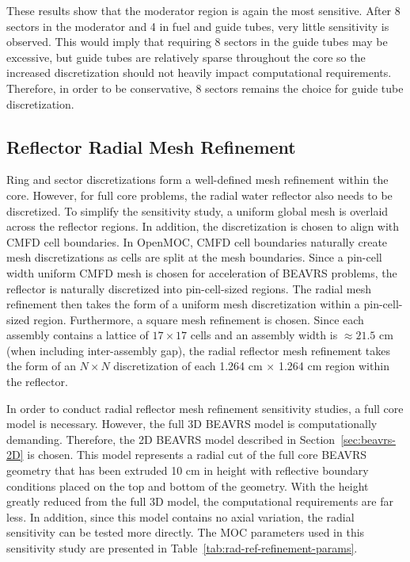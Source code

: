 These results show that the moderator region is again the most sensitive. After 8 sectors in the moderator and 4 in fuel and guide tubes, very little sensitivity is observed. This would imply that requiring 8 sectors in the guide tubes may be excessive, but guide tubes are relatively sparse throughout the core so the increased discretization should not heavily impact computational requirements. Therefore, in order to be conservative, 8 sectors remains the choice for guide tube discretization.

\subsection{Reflector Radial Mesh Refinement}

Ring and sector discretizations form a well-defined mesh refinement within the core. However, for full core problems, the radial water reflector also needs to be discretized. To simplify the sensitivity study, a uniform global mesh is overlaid across the reflector regions. In addition, the discretization is chosen to align with \ac{CMFD} cell boundaries. In OpenMOC, \ac{CMFD} cell boundaries naturally create mesh discretizations as cells are split at the mesh boundaries. Since a pin-cell width uniform \ac{CMFD} mesh is chosen for acceleration of BEAVRS problems, the reflector is naturally discretized into pin-cell-sized regions. The radial mesh refinement then takes the form of a uniform mesh discretization within a pin-cell-sized region. Furthermore, a square mesh refinement is chosen. Since each assembly contains a lattice of $17\times 17$ cells and an assembly width is $\approx 21.5$ cm (when including inter-assembly gap), the radial reflector mesh refinement takes the form of an $N \times N$ discretization of each 1.264 cm $\times$ 1.264 cm region within the reflector.

In order to conduct radial reflector mesh refinement sensitivity studies, a full core model is necessary. However, the full 3D BEAVRS model is computationally demanding. Therefore, the 2D BEAVRS model described in Section~\ref{sec:beavrs-2D} is chosen. This model represents a radial cut of the full core BEAVRS geometry that has been extruded 10 cm in height with reflective boundary conditions placed on the top and bottom of the geometry. With the height greatly reduced from the full 3D model, the computational requirements are far less. In addition, since this model contains no axial variation, the radial sensitivity can be tested more directly. The \ac{MOC} parameters used in this sensitivity study are presented in Table~\ref{tab:rad-ref-refinement-params}.


